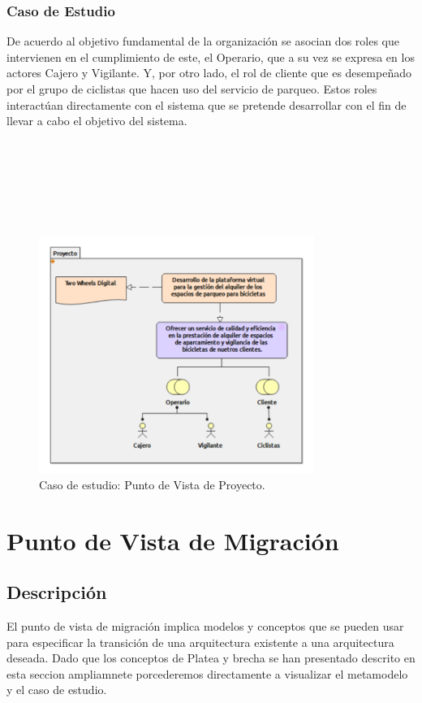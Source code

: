 \subsubsection{Caso de Estudio}
De acuerdo al objetivo fundamental de la organización se asocian dos roles que intervienen en el cumplimiento de este, el Operario, que a su vez se expresa en los actores Cajero y Vigilante. Y, por otro lado, el rol de cliente que es desempeñado por el grupo de ciclistas que hacen uso del servicio de parqueo. Estos roles interactúan directamente con el sistema que se pretende desarrollar con el fin de llevar a cabo el objetivo del sistema.
\\
\\
\\
\\
\\
\\
\\

\begin{figure}[h]
	\centering
	\includegraphics[width=0.8\textwidth]{imagenes/Caso_Estudio/Migracion/Proyecto.PDF}
	\caption{Caso de estudio: Punto de Vista de Proyecto.}
	\label{fig:gap_analysis}
\end{figure}

\section{Punto de Vista de Migración}
\subsection{Descripción}
El punto de vista de migración implica modelos y conceptos que se pueden usar para especificar la transición de una arquitectura existente a una arquitectura deseada. Dado que los conceptos de Platea y brecha se han presentado descrito en esta seccion ampliamnete porcederemos directamente a visualizar el metamodelo y el caso de estudio.

